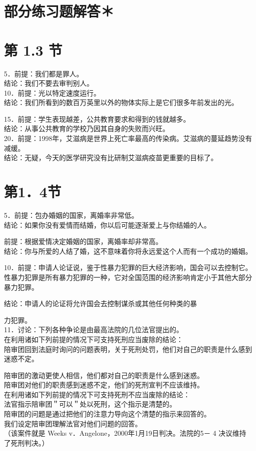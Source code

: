 \section*{部分练习题解答＊}
\section*{第 1.3 节}
5．前提：我们都是罪人。\\
结论：我们不要去审判别人。\\
10．前提：光以特定速度运行。\\
结论：我们所看到的数百万英里以外的物体实际上是它们很多年前发出的光。

15．前提：学生表现越差，公共教育要求和得到的钱就越多。\\
结论：从事公共教育的学校乃因其自身的失败而兴旺。\\
20．前提：1998年，艾滋病是世界上死亡率最高的传染病。艾滋病的蔓延趋势没有减缓。\\
结论：无疑，今天的医学研究没有比研制艾滋病疫苗更重要的目标了。

\section*{第1．4节}
5．前提：包办婚姻的国家，离婚率非常低。\\
结论：如果你没有爱情而结婚，你以后可能逐渐爱上与你结婚的人。

前提：根据爱情决定婚姻的国家，离婚率却非常高。\\
结论：你与所爱的人结了婚，这不意味着你将永远爱这个人而有一个成功的婚姻。

10．前提：申请人论证说，鉴于性暴力犯罪的巨大经济影响，国会可以去控制它。性暴力犯罪是所有暴力犯罪的一种，它对全国范围的经济影响肯定小于其他大部分暴力犯罪。

结论：申请人的论证将允许国会去控制谋杀或其他任何种类的暴

力犯罪。\\
11．讨论：下列各种争论是由最高法院的几位法官提出的。\\
在利用诸如下列前提的情况下可支持死刑应当废除的结论：\\
陪审团回到法庭时询问的问题表明，关于死刑处罚，他们对自己的职责是什么感到迷惑不定。

陪审团的激动更使人相信，他们都对自己的职责是什么感到迷惑。\\
陪审团对他们的职责感到迷惑不定，他们的死刑宣判不应该维持。\\
在利用诸如下列前提的情况下可支持死刑不应当废除的结论：\\
法官指示陪审团＂可以＂处以死刑，这个指示是清楚的。\\
陪审团的问题是通过把他们的注意力导向这个清楚的指示来回答的。\\
我们设定陪审团理解法官对他们问题的回答。\\
（该案件就是 Weeks v．Angelone，2000年1月19日判决。法院的5－ 4 决议维持了死刑判决。）

